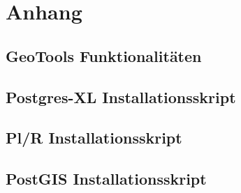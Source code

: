 % 








\frontmatter												%


\tableofcontents										%

\printglossary[title=Glossar] 			%
\printglossary[type=\acronymtype,title=Abk\"urzungsverzeichnis]	%

\listoffigures											%
\listoftables												%

\mainmatter													%


\appendix
\chapter{Anhang}
%	
\section{GeoTools Funktionalitäten}
	
\section{Postgres-XL Installationsskript}
	
\section{Pl/R Installationsskript}

\section{PostGIS Installationsskript}

